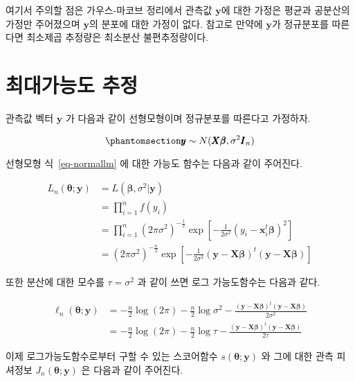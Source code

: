 \documentclass[
  11pt,
  a4paper,
  oneside]{scrbook}
\theoremstyle{definition}
\theoremstyle{plain}
\theoremstyle{definition}
\theoremstyle{definition}
\theoremstyle{remark}
\begin{document}
여기서 주의할 점은 가우스-마코브 정리에서 관측값 \(\pmb y\)에 대한
가정은 평균과 공분산의 가정만 주어졌으며 \(\pmb y\)의 분포에 대한 가정이
없다. 참고로 만약에 \(\pmb y\)가 정규분포를 따른다면 최소제곱 추정량은
최소분산 불편추정량이다.

\section{최대가능도
추정}\label{uxcd5cuxb300uxac00uxb2a5uxb3c4-uxcd94uxc815}

관측값 벡터 \(\pmb y\) 가 다음과 같이 선형모형이며 정규분포를 따른다고
가정하자.

\begin{equation}\phantomsection\label{eq-normallm}{
\pmb y \sim N( \pmb X \pmb \beta, \sigma^2 \pmb I_n) 
}\end{equation}

선형모형 식~\ref{eq-normallm} 에 대한 가능도 함수는 다음과 같이
주어진다.

\[
\begin{align}
 L_n( \pmb \theta ;  \pmb y) & = L( \pmb \beta,\sigma^2|  \pmb y) \\
   & = \prod^n_{i=1} f(y_i)\\
   & = \prod^n_{i=1}(2 \pi \sigma^2)^{-\frac{1}{2}} \exp \left [-\frac{1}{2\sigma^2} (y_i- {\pmb x}_i^t \pmb \beta)^2 \right ] \\
   & = (2\pi\sigma^2)^{-\frac{n}{2}} \exp \left [ -\frac{1}{2\sigma^2}( \pmb y- \pmb  X  \pmb \beta)^t( \pmb y- \pmb X  \pmb \beta) \right ]
\end{align}
\]

또한 분산에 대한 모수를 \(\tau=\sigma^2\) 과 같이 쓰면 로그 가능도함수는
다음과 같다.

\[
\begin{align}
\ell_n( \pmb \theta; \pmb y) & = -\frac{n}{2} \log (2 \pi)-\frac{n}{2} \log \sigma^2 -\frac { ( \pmb y- \pmb X  \pmb \beta)^t (\pmb  y- \pmb X  \pmb \beta) }{2\sigma^2} \\ 
   &= -\frac{n}{2} \log (2 \pi)-\frac{n}{2} \log \tau -\frac { ( \pmb y- \pmb X  \pmb \beta)^t ( \pmb y- \pmb X  \pmb \beta) }{2\tau}  
\end{align}
\]

이제 로그가능도함수로부터 구할 수 있는 스코어함수
\(s( \pmb \theta;\pmb y)\) 와 그에 대한 관측 피셔정보
\(J_n( \pmb \theta; \pmb y)\) 은 다음과 같이 주어진다.
\end{document}
